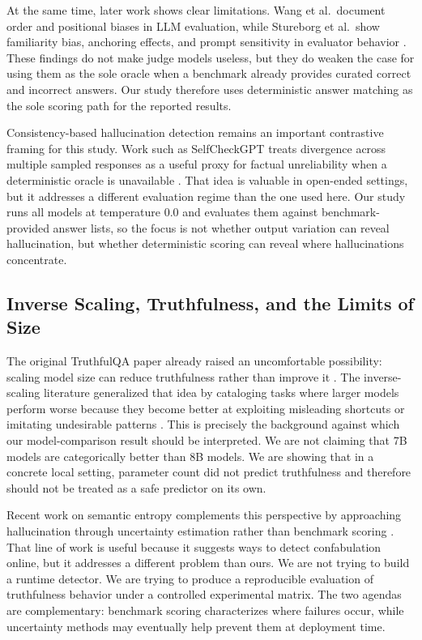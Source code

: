 \documentclass[conference]{IEEEtran}
\begin{document}
At the same time, later work shows clear limitations. Wang et al.\ document order and positional biases in LLM evaluation, while Stureborg et al.\ show familiarity bias, anchoring effects, and prompt sensitivity in evaluator behavior \cite{not_fair_eval,inconsistent_eval}. These findings do not make judge models useless, but they do weaken the case for using them as the sole oracle when a benchmark already provides curated correct and incorrect answers. Our study therefore uses deterministic answer matching as the sole scoring path for the reported results.

Consistency-based hallucination detection remains an important contrastive framing for this study. Work such as SelfCheckGPT treats divergence across multiple sampled responses as a useful proxy for factual unreliability when a deterministic oracle is unavailable \cite{selfcheckgpt}. That idea is valuable in open-ended settings, but it addresses a different evaluation regime than the one used here. Our study runs all models at temperature $0.0$ and evaluates them against benchmark-provided answer lists, so the focus is not whether output variation can reveal hallucination, but whether deterministic scoring can reveal where hallucinations concentrate.

\subsection{\textbf{Inverse Scaling, Truthfulness, and the Limits of Size}}

The original TruthfulQA paper already raised an uncomfortable possibility: scaling model size can reduce truthfulness rather than improve it \cite{truthfulqa}. The inverse-scaling literature generalized that idea by cataloging tasks where larger models perform worse because they become better at exploiting misleading shortcuts or imitating undesirable patterns \cite{inverse_scaling}. This is precisely the background against which our model-comparison result should be interpreted. We are not claiming that 7B models are categorically better than 8B models. We are showing that in a concrete local setting, parameter count did not predict truthfulness and therefore should not be treated as a safe predictor on its own.

Recent work on semantic entropy complements this perspective by approaching hallucination through uncertainty estimation rather than benchmark scoring \cite{semantic_entropy}. That line of work is useful because it suggests ways to detect confabulation online, but it addresses a different problem than ours. We are not trying to build a runtime detector. We are trying to produce a reproducible evaluation of truthfulness behavior under a controlled experimental matrix. The two agendas are complementary: benchmark scoring characterizes where failures occur, while uncertainty methods may eventually help prevent them at deployment time.
\end{document}
